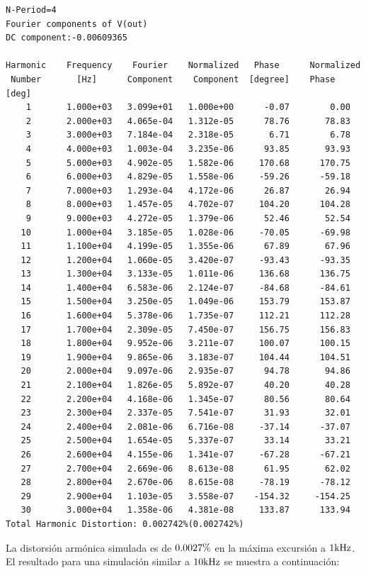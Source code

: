 \begin{lstlisting}
N-Period=4
Fourier components of V(out)
DC component:-0.00609365

Harmonic	Frequency	 Fourier 	Normalized	 Phase  	Normalized
 Number 	  [Hz]   	Component	 Component	[degree]	Phase [deg]
    1   	1.000e+03	3.099e+01	1.000e+00	   -0.07	    0.00
    2   	2.000e+03	4.065e-04	1.312e-05	   78.76	   78.83
    3   	3.000e+03	7.184e-04	2.318e-05	    6.71	    6.78
    4   	4.000e+03	1.003e-04	3.235e-06	   93.85	   93.93
    5   	5.000e+03	4.902e-05	1.582e-06	  170.68	  170.75
    6   	6.000e+03	4.829e-05	1.558e-06	  -59.26	  -59.18
    7   	7.000e+03	1.293e-04	4.172e-06	   26.87	   26.94
    8   	8.000e+03	1.457e-05	4.702e-07	  104.20	  104.28
    9   	9.000e+03	4.272e-05	1.379e-06	   52.46	   52.54
   10   	1.000e+04	3.185e-05	1.028e-06	  -70.05	  -69.98
   11   	1.100e+04	4.199e-05	1.355e-06	   67.89	   67.96
   12   	1.200e+04	1.060e-05	3.420e-07	  -93.43	  -93.35
   13   	1.300e+04	3.133e-05	1.011e-06	  136.68	  136.75
   14   	1.400e+04	6.583e-06	2.124e-07	  -84.68	  -84.61
   15   	1.500e+04	3.250e-05	1.049e-06	  153.79	  153.87
   16   	1.600e+04	5.378e-06	1.735e-07	  112.21	  112.28
   17   	1.700e+04	2.309e-05	7.450e-07	  156.75	  156.83
   18   	1.800e+04	9.952e-06	3.211e-07	  100.07	  100.15
   19   	1.900e+04	9.865e-06	3.183e-07	  104.44	  104.51
   20   	2.000e+04	9.097e-06	2.935e-07	   94.78	   94.86
   21   	2.100e+04	1.826e-05	5.892e-07	   40.20	   40.28
   22   	2.200e+04	4.168e-06	1.345e-07	   80.56	   80.64
   23   	2.300e+04	2.337e-05	7.541e-07	   31.93	   32.01
   24   	2.400e+04	2.081e-06	6.716e-08	  -37.14	  -37.07
   25   	2.500e+04	1.654e-05	5.337e-07	   33.14	   33.21
   26   	2.600e+04	4.155e-06	1.341e-07	  -67.28	  -67.21
   27   	2.700e+04	2.669e-06	8.613e-08	   61.95	   62.02
   28   	2.800e+04	2.670e-06	8.615e-08	  -78.19	  -78.12
   29   	2.900e+04	1.103e-05	3.558e-07	 -154.32	 -154.25
   30   	3.000e+04	1.358e-06	4.381e-08	  133.87	  133.94
Total Harmonic Distortion: 0.002742%(0.002742%)

\end{lstlisting}

\normalfont
\normalsize


La distorsión armónica simulada es de $0.0027 \si[per-mode=symbol]{\percent}$ en la máxima excursión a $1 \si[per-mode=symbol]{\kilo\hertz}$. El resultado para una simulación similar a $10 \si[per-mode=symbol]{\kilo\hertz}$ se muestra a continuación:



\clearpage



